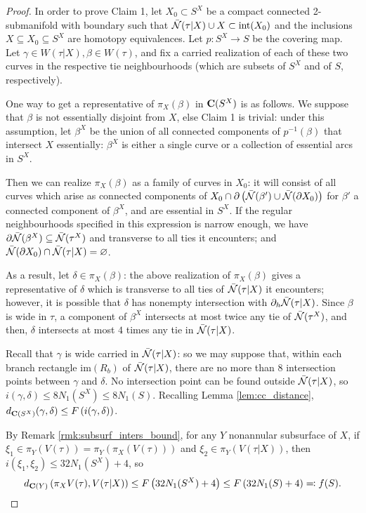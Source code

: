 \begin{proof}
In order to prove Claim 1, let $X_0\subset S^X$ be a compact connected 2-submanifold with boundary such that $\bar{{\mathcal N}}(\tau|X)\cup X\subset \mathrm{int}(X_0)$ and the inclusions $X\subseteq X_0\subseteq S^X$ are homotopy equivalences. Let $p:S^X\rightarrow S$ be the covering map. Let $\gamma\in W(\tau|X), \beta\in W(\tau)$, and fix a carried realization of each of these two curves in the respective tie neighbourhoods (which are subsets of $S^X$ and of $S$, respectively).

One way to get a representative of $\pi_X(\beta)$ in $\mathbf C(S^X)$ is as follows. We suppose that $\beta$ is not essentially disjoint from $X$, else Claim 1 is trivial: under this assumption, let $\beta^X$ be the union of all connected components of $p^{-1}(\beta)$ that intersect $X$ essentially: $\beta^X$ is either a single curve or a collection of essential arcs in $S^X$.

Then we can realize $\pi_X(\beta)$ as a family of curves in $X_0$: it will consist of all curves which arise as connected components of $X_0\cap\partial\left(\bar{{\mathcal N}}(\beta')\cup \bar{{\mathcal N}}(\partial X_0)\right)$ for $\beta'$ a connected component of $\beta^X$, and are essential in $S^X$. If the regular neighbourhoods specified in this expression is narrow enough, we have $\partial\bar{{\mathcal N}}(\beta^X)\subseteq \bar{{\mathcal N}}(\tau^X)$ and transverse to all ties it encounters; and $\bar{{\mathcal N}}(\partial X_0)\cap \bar{{\mathcal N}}(\tau|X)=\varnothing$. 

As a result, let $\delta\in\pi_X(\beta)$: the above realization of $\pi_X(\beta)$ gives a representative of $\delta$ which is transverse to all ties of $\bar{{\mathcal N}}(\tau|X)$ it encounters; however, it is possible that $\delta$ has nonempty intersection with $\partial_h\bar{{\mathcal N}}(\tau|X)$. Since $\beta$ is wide in $\tau$, a component of $\beta^X$ intersects at most twice any tie of $\bar{{\mathcal N}}(\tau^X)$, and then, $\delta$ intersects at most $4$ times any tie in $\bar{{\mathcal N}}(\tau|X)$.

Recall that $\gamma$ is wide carried in $\bar{{\mathcal N}}(\tau|X)$: so we may suppose that, within each branch rectangle $\mathrm{im}(R_b)$ of $\bar{{\mathcal N}}(\tau|X)$, there are no more than $8$ intersection points between $\gamma$ and $\delta$. No intersection point can be found outside $\bar{{\mathcal N}}(\tau|X)$, so $i(\gamma,\delta)\leq 8N_1(S^X) \leq 8N_1(S)$. Recalling Lemma \ref{lem:cc_distance}, $d_{\mathbf C(S^X)}(\gamma,\delta)\leq F\left( i(\gamma,\delta)\right)$.

By Remark \ref{rmk:subsurf_inters_bound}, for any $Y$ nonannular subsurface of $X$, if $\xi_1\in \pi_Y\left(V(\tau)\right)=\pi_Y\left(\pi_X\left(V(\tau)\right)\right)$ and $\xi_2\in \pi_Y\left(V(\tau|X)\right)$, then $i(\xi_1, \xi_2)\leq 32 N_1(S^X) + 4$, so
$$d_{\mathbf C(Y)}\left(\pi_X V(\tau),V(\tau|X)\right)\leq F\left(32 N_1(S^X) + 4\right)\leq F\left(32 N_1(S) + 4\right)\eqqcolon f(S).$$


\end{proof}
